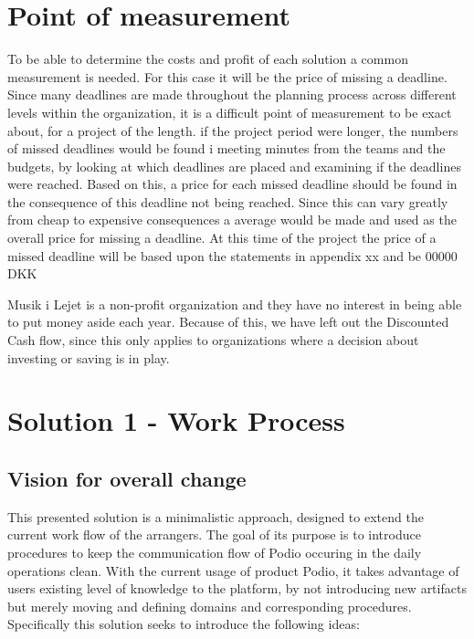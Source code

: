 \section{Point of measurement}
To be able to determine the costs and profit of each solution a common measurement is needed. For this case it will be the price of missing a deadline. Since many deadlines are made throughout the planning process across different levels within the organization, it is a difficult point of measurement to be exact about, for a project of the length. if the project period were longer, the numbers of missed deadlines would be found i meeting minutes from the teams and the budgets, by looking at which deadlines are placed and examining if the deadlines were reached. Based on this, a price for each missed deadline should be found in the consequence of this deadline not being reached. Since this can vary greatly from cheap to expensive consequences a average would be made and used as the overall price for missing a deadline. At this time of the project the price of a missed deadline will be based upon the statements in appendix xx and be 00000 DKK



Musik i Lejet is a non-profit organization and they have no interest in being able to put money aside each year. Because of this, we have left out the Discounted Cash flow, since this only applies to organizations where a decision about investing or saving is in play.
  
\section{Solution 1 - Work Process}

\subsection{Vision for overall change} 
This presented solution is a minimalistic approach, designed to extend the current work flow of the arrangers. The goal of its purpose is to introduce procedures to keep the communication flow of Podio occuring in the daily operations clean. With the current usage of product Podio, it takes advantage of users existing level of knowledge to the platform, by not introducing new artifacts but merely moving and defining domains and corresponding procedures. Specifically this solution seeks to introduce the following ideas:

